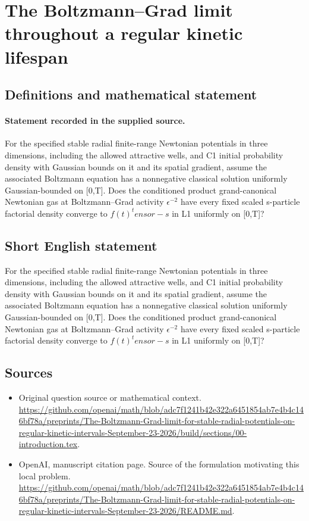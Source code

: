 \documentclass[11pt]{article}
\begin{document}
\section*{The Boltzmann–Grad limit throughout a regular kinetic lifespan}\label{statement}
\subsection{Definitions and mathematical statement}
\paragraph{Statement recorded in the supplied source.}
For the specified stable radial finite-range Newtonian potentials in three dimensions, including the allowed attractive wells, and C1 initial probability density with Gaussian bounds on it and its spatial gradient, assume the associated Boltzmann equation has a nonnegative classical solution uniformly Gaussian-bounded on [0,T]. Does the conditioned product grand-canonical Newtonian gas at Boltzmann–Grad activity $\epsilon ^{-2}$ have every fixed scaled s-particle factorial density converge to $f(t)^tensor-s$ in L1 uniformly on [0,T]?
\subsection{Short English statement}
For the specified stable radial finite-range Newtonian potentials in three dimensions, including the allowed attractive wells, and C1 initial probability density with Gaussian bounds on it and its spatial gradient, assume the associated Boltzmann equation has a nonnegative classical solution uniformly Gaussian-bounded on [0,T]. Does the conditioned product grand-canonical Newtonian gas at Boltzmann–Grad activity $\epsilon ^{-2}$ have every fixed scaled s-particle factorial density converge to $f(t)^tensor-s$ in L1 uniformly on [0,T]?
\subsection{Sources}
\begin{itemize}
\item[S1] Original question source or mathematical context.
\url{https://github.com/openai/math/blob/adc7f1241b42e322a6451854ab7e4b4c146bf78a/preprints/The-Boltzmann-Grad-limit-for-stable-radial-potentials-on-regular-kinetic-intervals-September-23-2026/build/sections/00-introduction.tex}.
\item[S2] OpenAI, manuscript citation page. Source of the formulation motivating this local problem.
\url{https://github.com/openai/math/blob/adc7f1241b42e322a6451854ab7e4b4c146bf78a/preprints/The-Boltzmann-Grad-limit-for-stable-radial-potentials-on-regular-kinetic-intervals-September-23-2026/README.md}.
\end{itemize}
\end{document}
